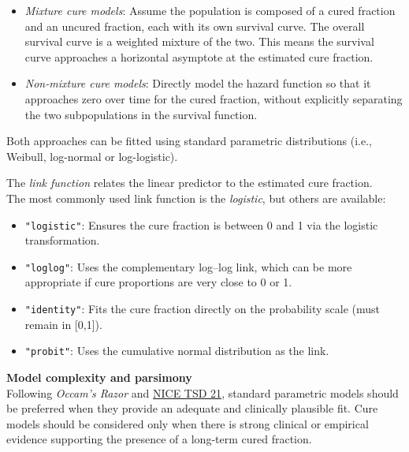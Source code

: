 \documentclass[
]{article}
\providecommand{\tightlist}{%
  \setlength{\itemsep}{0pt}\setlength{\parskip}{0pt}}
\begin{document}
\begin{itemize}
\tightlist
\item
  \emph{Mixture cure models}: Assume the population is composed of a
  cured fraction and an uncured fraction, each with its own survival
  curve. The overall survival curve is a weighted mixture of the two.
  This means the survival curve approaches a horizontal asymptote at the
  estimated cure fraction.\\
\item
  \emph{Non-mixture cure models}: Directly model the hazard function so
  that it approaches zero over time for the cured fraction, without
  explicitly separating the two subpopulations in the survival function.
\end{itemize}

Both approaches can be fitted using standard parametric distributions
(i.e., Weibull, log-normal or log-logistic).

The \emph{link function} relates the linear predictor to the estimated
cure fraction.\\
The most commonly used link function is the \emph{logistic}, but others
are available:

\begin{itemize}
\tightlist
\item
  \texttt{"logistic"}: Ensures the cure fraction is between 0 and 1 via
  the logistic transformation.\\
\item
  \texttt{"loglog"}: Uses the complementary log--log link, which can be
  more appropriate if cure proportions are very close to 0 or 1.\\
\item
  \texttt{"identity"}: Fits the cure fraction directly on the
  probability scale (must remain in {[}0,1{]}).\\
\item
  \texttt{"probit"}: Uses the cumulative normal distribution as the
  link.
\end{itemize}

\textbf{Model complexity and parsimony}\\
Following \emph{Occam's Razor} and
\href{https://www.sheffield.ac.uk/media/34188/download?attachment}{NICE
TSD 21}, standard parametric models should be preferred when they
provide an adequate and clinically plausible fit. Cure models should be
considered only when there is strong clinical or empirical evidence
supporting the presence of a long-term cured fraction.
\end{document}
